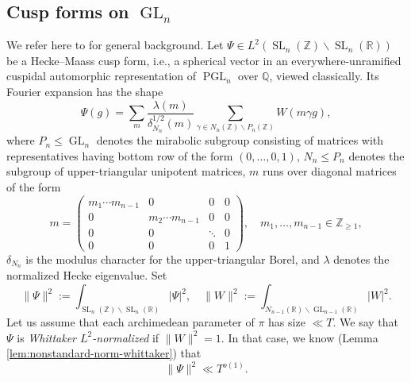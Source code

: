 \documentclass[reqno]{amsart}
\DeclareMathOperator{\SL}{SL}
\DeclareMathOperator{\GL}{GL}
\DeclareMathOperator{\PGL}{PGL}
\theoremstyle{plain} \newtheorem{theorem} {Theorem}
\theoremstyle{definition} \newtheorem{definition} [theorem] {Definition}
\theoremstyle{itplain} %
\numberwithin{equation}{section}
\numberwithin{theorem}{section}
\renewcommand{\geq}{\geqslant}
\renewcommand{\leq}{\leqslant}
\begin{document}
\subsection{Cusp forms on $\GL_n$}\label{sec:simpler-cusp-forms-gl_n}
We refer here to \cite{MR3468028} for general background.  Let $\Psi \in L^2(\SL_n(\mathbb{Z}) \backslash \SL_n(\mathbb{R}))$ be a Hecke--Maass cusp form, i.e., a spherical vector in an everywhere-unramified cuspidal automorphic representation of $\PGL_n$ over $\mathbb{Q}$, viewed classically.  Its Fourier expansion has the shape
\begin{equation*}
  \Psi(g) = \sum _{m}
  \frac{\lambda (m)}{\delta_{N_n}^{1/2}(m)}
  \sum _{\gamma \in N_n(\mathbb{Z}) \backslash P_n(\mathbb{Z})}
  W(m \gamma g),
\end{equation*}
where $P_n \leq \GL_n$ denotes the mirabolic subgroup consisting of matrices with representatives having bottom row of the form $(0,\dotsc,0,1)$,  $N_n \leq P_n$ denotes the subgroup of upper-triangular unipotent matrices, $m$ runs over diagonal matrices of the form
\begin{equation*}
  m =
  \begin{pmatrix}
    m_1 \dotsb m_{n-1} & 0 & 0 & 0 \\
    0 & m_2 \dotsb m_{n-1} & 0 & 0 \\
    0 & 0 & \ddots & 0 \\
    0 & 0 & 0 & 1
  \end{pmatrix},
  \quad 
  m_1, \dotsc, m_{n-1} \in \mathbb{Z}_{\geq 1},
\end{equation*}
$\delta_{N_n}$ is the modulus character for the upper-triangular Borel, and $\lambda$ denotes the normalized Hecke eigenvalue.  Set
\begin{equation*}
  \|\Psi \|^2 := \int _{\SL_n(\mathbb{Z}) \backslash \SL_n(\mathbb{R})} |\Psi|^2,
  \quad
  \|W\|^2 := \int _{N_{n-1}(\mathbb{R}) \backslash \GL_{n-1}(\mathbb{R})} |W|^2.
\end{equation*}
Let us assume that each archimedean parameter of $\pi$ has size $\ll T$.  We say that $\Psi$ is \emph{Whittaker $L^2$-normalized} if $\|W\|^2 = 1$.  In that case, we know (Lemma \ref{lem:nonstandard-norm-whittaker}) that
\begin{equation}\label{eq:psi-2-ll}
\|\Psi \|^2 \ll T^{o(1)}.
\end{equation}
\end{document}
